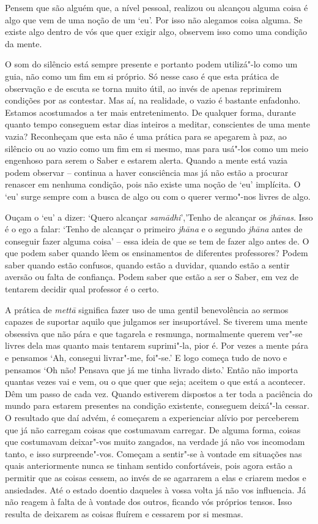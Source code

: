 Pensem que são alguém que, a nível pessoal, realizou ou alcançou alguma
coisa é algo que vem de uma noção de um `eu'. Por isso não alegamos
coisa alguma. Se existe algo dentro de vós que quer exigir algo,
observem isso como uma condição da mente.

O som do silêncio está sempre presente e portanto podem utilizá"-lo como
um guia, não como um fim em si próprio. Só nesse caso é que esta prática
de observação e de escuta se torna muito útil, ao invés de apenas
reprimirem condições por as contestar. Mas aí, na realidade, o vazio é
bastante enfadonho. Estamos acostumados a ter mais entretenimento. De
qualquer forma, durante quanto tempo conseguem estar dias inteiros a
meditar, conscientes de uma mente vazia? Reconheçam que esta não é uma
prática para se apegarem à paz, ao silêncio ou ao vazio como um fim em
si mesmo, mas para usá"-los como um meio engenhoso para serem o Saber e
estarem alerta. Quando a mente está vazia podem observar -- continua a
haver consciência mas já não estão a procurar renascer em nenhuma
condição, pois não existe uma noção de `eu' implícita. O `eu' surge
sempre com a busca de algo ou com o querer vermo"-nos livres de algo.

Ouçam o `eu' a dizer: `Quero alcançar \emph{samādhi}','Tenho de alcançar
os \emph{jhānas}. Isso é o ego a falar: `Tenho de alcançar o primeiro
\emph{jhāna} e o segundo \emph{jhāna} antes de conseguir fazer alguma
coisa' -- essa ideia de que se tem de fazer algo antes de. O que podem
saber quando lêem os ensinamentos de diferentes professores? Podem saber
quando estão confusos, quando estão a duvidar, quando estão a sentir
aversão ou falta de confiança. Podem saber que estão a ser o Saber, em
vez de tentarem decidir qual professor é o certo.

A prática de \emph{mettā} significa fazer uso de uma gentil benevolência
ao sermos capazes de suportar aquilo que julgamos ser insuportável. Se
tiverem uma mente obsessiva que não pára e que tagarela e resmunga,
normalmente querem ver"-se livres dela mas quanto mais tentarem
suprimi"-la, pior é. Por vezes a mente pára e pensamos `Ah, consegui
livrar"-me, foi"-se.' E logo começa tudo de novo e pensamos `Oh não!
Pensava que já me tinha livrado disto.' Então não importa quantas vezes
vai e vem, ou o que quer que seja; aceitem o que está a acontecer. Dêm
um passo de cada vez. Quando estiverem dispostos a ter toda a paciência
do mundo para estarem presentes na condição existente, conseguem
deixá"-la cessar. O resultado que daí advém, é começarem a experienciar
alívio por perceberem que já não carregam coisas que costumavam
carregar. De alguma forma, coisas que costumavam deixar"-vos muito
zangados, na verdade já não vos incomodam tanto, e isso surpreende"-vos.
Começam a sentir"-se à vontade em situações nas quais anteriormente nunca
se tinham sentido confortáveis, pois agora estão a permitir que as
coisas cessem, ao invés de se agarrarem a elas e criarem medos e
ansiedades. Até o estado doentio daqueles à vossa volta já não vos
influencia. Já não reagem à falta de à vontade dos outros, ficando vós
próprios tensos. Isso resulta de deixarem as coisas fluírem e cessarem
por si mesmas.

